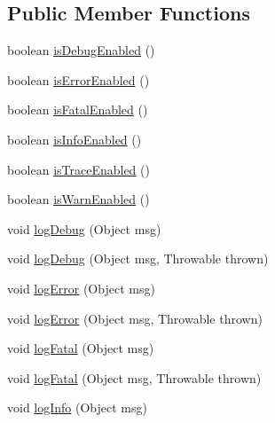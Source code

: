 \subsection*{Public Member Functions}
\begin{DoxyCompactItemize}
\item 
boolean \mbox{\hyperlink{interfacecom_1_1mysql_1_1jdbc_1_1log_1_1_log_a2e59f38e2359e90879c658cfb2f4e518}{is\+Debug\+Enabled}} ()
\item 
boolean \mbox{\hyperlink{interfacecom_1_1mysql_1_1jdbc_1_1log_1_1_log_aece1d483e86ea84bd1553ed993c56c59}{is\+Error\+Enabled}} ()
\item 
boolean \mbox{\hyperlink{interfacecom_1_1mysql_1_1jdbc_1_1log_1_1_log_acc3f527d8a1e3143e312eb4368c3632a}{is\+Fatal\+Enabled}} ()
\item 
boolean \mbox{\hyperlink{interfacecom_1_1mysql_1_1jdbc_1_1log_1_1_log_a8ca112798ee938dfb0fa06ffca504922}{is\+Info\+Enabled}} ()
\item 
boolean \mbox{\hyperlink{interfacecom_1_1mysql_1_1jdbc_1_1log_1_1_log_a821407c0c861bbb9de4618617e2fa519}{is\+Trace\+Enabled}} ()
\item 
boolean \mbox{\hyperlink{interfacecom_1_1mysql_1_1jdbc_1_1log_1_1_log_ae786b79391cf28f119aa7b12226b7e2b}{is\+Warn\+Enabled}} ()
\item 
void \mbox{\hyperlink{interfacecom_1_1mysql_1_1jdbc_1_1log_1_1_log_aa6f1e099156b6a444addba331704c2fe}{log\+Debug}} (Object msg)
\item 
void \mbox{\hyperlink{interfacecom_1_1mysql_1_1jdbc_1_1log_1_1_log_ae11c12bcf67d9681ab03e97b9098d28d}{log\+Debug}} (Object msg, Throwable thrown)
\item 
void \mbox{\hyperlink{interfacecom_1_1mysql_1_1jdbc_1_1log_1_1_log_aefe78baa37affef138eaba105b699022}{log\+Error}} (Object msg)
\item 
void \mbox{\hyperlink{interfacecom_1_1mysql_1_1jdbc_1_1log_1_1_log_abca2e1258e8b1bca83fd13066e8930cd}{log\+Error}} (Object msg, Throwable thrown)
\item 
void \mbox{\hyperlink{interfacecom_1_1mysql_1_1jdbc_1_1log_1_1_log_a8d3b6b295ded6eaa1bfa50ffca6a4d28}{log\+Fatal}} (Object msg)
\item 
void \mbox{\hyperlink{interfacecom_1_1mysql_1_1jdbc_1_1log_1_1_log_a6da5bf2be5d9c63cfd192ab457aaff92}{log\+Fatal}} (Object msg, Throwable thrown)
\item 
void \mbox{\hyperlink{interfacecom_1_1mysql_1_1jdbc_1_1log_1_1_log_a6a380b7638c3ebe1251d4e07cb7f4569}{log\+Info}} (Object msg)
\item 

\end{DoxyCompactItemize}
